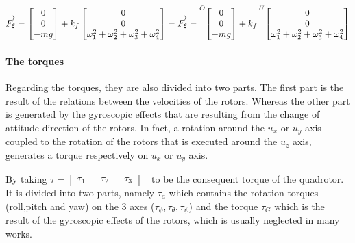 \documentclass{thesisreport}
\begin{document}
\begin{equation}
\overrightarrow{F_{\xi}}  = \begin{bmatrix}
0 \\
0 \\
-mg \\
\end{bmatrix} 
+ 
k_f \begin{bmatrix}
0 \\ 
0 \\
\omega_1^2 + \omega_2^2 + \omega_3^2 + \omega_4^2\\
\end{bmatrix}=
\overrightarrow{F_{\xi}}  =  
\prescript{O}{}{\begin{bmatrix}
0 \\
0 \\
-mg \\
\end{bmatrix}}
+ k_f \prescript{U}{}{\begin{bmatrix}
0 \\ 
0 \\
\omega_1^2 + \omega_2^2 + \omega_3^2 + \omega_4^2\\
\end{bmatrix}}
\end{equation}








\newpage

\paragraph{The torques}
Regarding the torques, they are also divided into two parts. The first part is the result of the relations between the velocities of the rotors. Whereas the other part is generated by the gyroscopic effects that are resulting from the change of attitude direction of the rotors. In fact, a rotation around the $u_x$ or $u_y$ axis coupled to the rotation of the rotors that is executed around the $u_z$ axis, generates a torque respectively on $u_x$ or $u_y$ axis.

By taking $\tau=\begin{bmatrix}
\tau_1 && \tau_2 && \tau_3 
\end{bmatrix}^{\intercal}$ to be the consequent torque of the quadrotor. It is divided into two parts, namely $\tau_a$ which contains the rotation torques (roll,pitch and yaw) on the 3 axes ($\tau_{\phi}, \tau_{\theta}, \tau_{\psi}$) and the torque $\tau_G$ which is the result of the gyroscopic effects of the rotors, which is usually neglected in many works.
\end{document}
